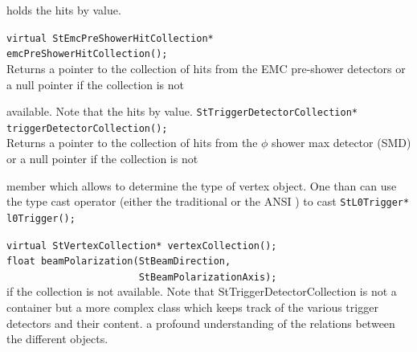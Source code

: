 \begin{enumerate}
\begin{Entry}
     holds the hits by value.

    \verb+virtual StEmcPreShowerHitCollection*+\\
    \verb+emcPreShowerHitCollection();+\\
    Returns a pointer to the collection of hits from the EMC
    pre-shower detectors or a null pointer if the collection is not
    
    available.  Note that  the
     
    hits by value.
    \verb+StTriggerDetectorCollection* triggerDetectorCollection();+\\
    Returns a pointer to the collection of hits from the $\phi$ shower
    max detector (SMD) or a null pointer if the collection is not
   
    member  which allows to determine the type of vertex
    object. One than can use the type cast operator (either the
    traditional \name{()} or the ANSI ) to cast
    \verb+StL0Trigger* l0Trigger();+\\
    
      

    \verb+virtual StVertexCollection* vertexCollection();+\\
    \verb+float beamPolarization(StBeamDirection,+\\ 
    \verb+                       StBeamPolarizationAxis);+\\
    if the collection is not available. Note that StTriggerDetectorCollection
    is not a container but a more complex class which keeps track of the
    various trigger detectors and their content.
    a profound understanding of the relations between the different objects.    
    

\end{Entry}
\end{enumerate}

